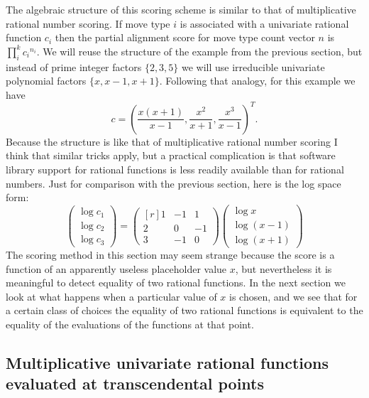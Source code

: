 \documentclass{article}
\begin{document}
The algebraic structure of this scoring scheme
is similar to that of multiplicative rational number scoring.
If move type $i$ is associated with a univariate
rational function $c_i$
then the partial alignment score for move type count vector $n$ is
$\prod_i^k {c_i}^{n_i}$.
We will reuse the structure of the example from the previous section,
but instead of prime integer factors $\{2, 3, 5\}$ we will use
irreducible univariate polynomial factors $\{x, x-1, x+1\}$.
Following that analogy, for this example we have
\begin{equation*}
c =
\left(
\frac{x \left( x + 1 \right)}{x-1},
\frac{x^2}{x+1},
\frac{x^3}{x-1}
\right)^T.
\end{equation*}
%
Because the structure is like that of multiplicative rational number
scoring I think that similar tricks apply,
but a practical complication is that software library support
for rational functions is less readily available than for rational numbers.
Just for comparison with the previous section,
here is the log space form:
%
\begin{equation*}
\begin{pmatrix*}
\log{c_1} \\
\log{c_2} \\
\log{c_3}
\end{pmatrix*}
=
\begin{pmatrix*}[r]
1 & -1 & 1 \\
2 & 0 & -1 \\
3 & -1 & 0
\end{pmatrix*}
\begin{pmatrix*}
\log{x} \\
\log{\left(x - 1\right)} \\
\log{\left(x + 1\right)}
\end{pmatrix*}
\end{equation*}
%
The scoring method in this section may seem strange
because the score is a function of an apparently useless placeholder
value $x$, but nevertheless it is meaningful to detect equality of two
rational functions.
In the next section we look at what happens
when a particular value of $x$ is chosen,
and we see that for a certain class of choices the
equality of two rational functions
is equivalent to the equality of the evaluations of the functions
at that point.


\subsection*{Multiplicative univariate rational functions
evaluated at transcendental points}
\end{document}
